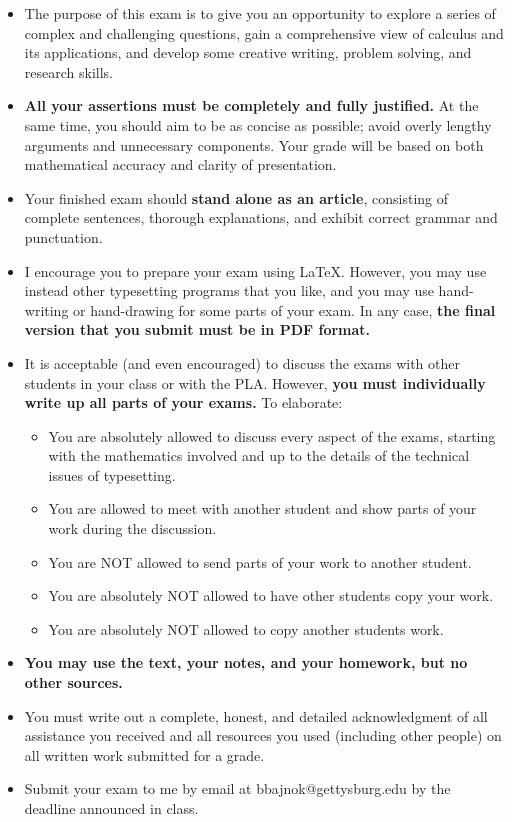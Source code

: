 \documentclass[12pt]{article}
\begin{document}
\begin{itemize}
  
\item The purpose of this exam is to give you an opportunity to explore a series of complex and challenging questions, gain a comprehensive view of calculus and its applications, and develop some creative writing, problem solving, and research skills.

\item  {\bf All your assertions must be completely and fully justified.} At the same time, you should aim to be as concise as possible; avoid overly lengthy arguments and unnecessary components.  Your grade will be based on both mathematical accuracy and clarity of presentation.

\item 
Your finished exam should  {\bf stand alone as an article}, consisting of complete sentences, thorough explanations, and exhibit correct grammar and punctuation.

\item I encourage you to prepare your exam using LaTeX.  However, you may use instead other typesetting programs that you like, and you may use hand-writing or hand-drawing for some parts of your exam.  In any case, {\bf the final version that you submit must be in PDF format.}  

\item It is acceptable (and even encouraged) to discuss the exams with other students in your class or with the PLA.  However,  {\bf  you must individually write up all parts of your exams.}  To elaborate:

\begin{itemize}  
\item	You are absolutely allowed to discuss every aspect of the exams, starting with the mathematics involved and up to the details of the technical issues of typesetting.
\item	You are allowed to meet with another student and show parts of your work during the discussion.
\item	You are NOT allowed to send parts of your work to another student.
\item	You are absolutely NOT allowed to have other students copy your work.
\item	You are absolutely NOT allowed to copy another students work.
\end{itemize}


\item {\bf You may use the text, your notes, and your homework, but no other sources.}
 
\item You must write out a complete, honest, and detailed acknowledgment of all assistance you received and all resources you used (including other people) on all written work submitted for a grade.

\item Submit your exam to me by email at bbajnok@gettysburg.edu by the deadline announced in class.







\end{itemize}
\end{document}
